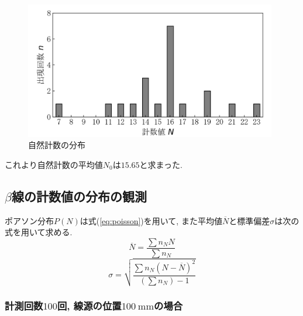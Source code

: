 \documentclass{jarticle}
\begin{document}
\begin{figure}[H]
  \begin{center}
    \includegraphics[width=110mm]{graph/count-distribution-100mm-20times.png}
    \caption{自然計数の分布}
    \label{fg:natural-count-distribution}
  \end{center}
\end{figure}

これより自然計数の平均値$N_0$は$15.65$と求まった.


\subsection{$\beta$線の計数値の分布の観測}

ポアソン分布$P(N)$は式(\ref{eq:poisson})を用いて, また平均値$\overline{N}$と標準偏差$\sigma$は次の式を用いて求める.
\begin{equation}
  \overline{N} = \frac{\sum n_N N}{\sum n_N}
\end{equation}
\begin{equation}
  \sigma = \sqrt{\frac{\sum n_N (N-\overline{N})^2}{(\sum n_N) - 1}}
\end{equation}


\subsubsection{計測回数$100$回, 線源の位置$100\ \mathrm{mm}$の場合}

\end{document}
